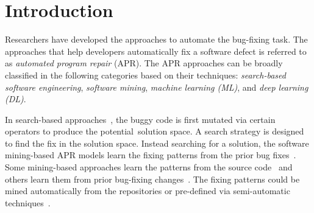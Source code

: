 \section{Introduction}


Researchers have developed the approaches to automate the
bug-fixing task. The approaches that help
developers automatically fix a software defect is
referred to as {\em automated program repair} (APR). The APR
approaches can be broadly classified in the following categories
based on their techniques:
{\em search-based software engineering}, {\em software mining}, {\em
  machine learning (ML)}, and {\em deep learning (DL)}.

In search-based
approaches~\cite{LeGoues-icse12,le2011genprog,martinez2016astor,qi2014strength},
the buggy code is first mutated via certain operators to produce the
potential~solution space. A search strategy is designed to find
the fix in the solution space. Instead searching for a solution, the
software mining-based APR models learn the fixing patterns from
the prior bug
fixes~\cite{kim2013automatic,le2016history,liu2019avatar,tbar-issta19,nguyen2013semfix,
  icse10,ray-fse12}. Some mining-based approaches learn the patterns
from the source code~\cite{liu2019avatar,tbar-issta19} and others
learn them from prior bug-fixing
changes~\cite{wen2018context,Simfix,koyuncu2018fixminer}.  The fixing
patterns could be mined automatically from the repositories
or pre-defined via semi-automatic
techniques~\cite{le2016history,nguyen2013semfix,liu2019avatar,tbar-issta19}.


